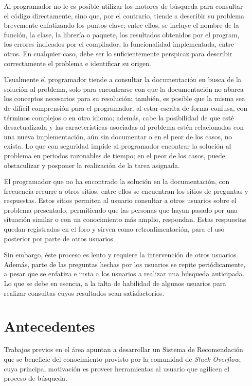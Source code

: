 Al programador no le es posible utilizar los motores de búsqueda para consultar el código directamente,
sino que, por el contrario, tiende a describir su problema brevemente enfatizando los puntos clave;
entre ellos, se incluye el nombre de la función, la clase, la librería o paquete,
los resultados obtenidos por el program, los errores indicados por el compilador,
la funcionalidad implementada, entre otros. En cualquier caso,
debe ser lo suficientemente perspicaz para describir correctamente el problema e identificar su origen.

Usualmente el programador tiende a consultar la documentación en busca de la solución al problema,
solo para encontrarse con que la documentación no abarca los conceptos necesarios para su resolución;
también, es posible que la misma sea de difícil comprensión para el programador,
al estar escrita de forma confusa, con términos complejos o en otro idioma;
además, cabe la posibilidad de que esté desactualizada y 
las características asociadas al problema estén relacionadas con una nueva implementación,
aún sin documentar o en el peor de los casos, no exista.
Lo que con seguridad impide al programador encontrar la solución al problema en periodos razonables de tiempo;
en el peor de los casos, puede obstaculizar y posponer la realización de la tarea asignada.

El programador que no ha encontrado la solución en la documentación,
con frecuencia recurre a otros sitios, entre ellos se encuentran los sitios de preguntas y respuestas.
Estos sitios permiten al usuario consultar a otros usuarios sobre el problema presentado,
permitiendo que las personas que hayan pasado por una situación similar
o con un conocimiento más amplio, respondan.
Estas respuestas quedan registradas en el foro y sirven como retroalimentación,
para el uso posterior por parte de otros usuarios.

Sin embargo, éste proceso es lento y requiere la intervención de otros usuarios.
Además, parte de las preguntas hechas por los usuarios se repite periódicamente,
a pesar que se enfatiza e insta a los usuarios a realizar una búsqueda anticipada.
Lo que se debe en esencia, a la falta de habilidad de algunos usuarios para realizar
consultas cuyos resultados sean satisfactorios.

\section*{Antecedentes}

Trabajos previos en el área apuntan a desarrollar un Sistema de Recomendación
que se beneficie del conocimiento provisto por la comunidad de \textit{Stack Overflow},
cuya principal motivación es proveer herramientas al usuario que agilicen el proceso de búsqueda.

